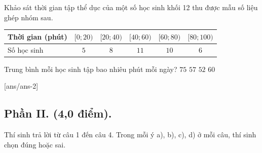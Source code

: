 \begin{ex}
	Khảo sát thời gian tập thể dục của một số học sinh khối 12 thu được mẫu số liệu ghép nhóm sau.
	\begin{center}
		\begin{tabular}{|l|c|c|c|c|c|}
			\hline
			Thời gian (phút) & $[0;20)$ & $[20;40)$ & $[40;60)$ & $[60;80)$ & $[80;100)$ \\
			\hline
			Số học sinh & $5$ & $8$ & $11$ & $10$ & $6$ \\
			\hline
		\end{tabular}
	\end{center}
	Trung bình mỗi học sinh tập bao nhiêu phút mỗi ngày?
	\choice
	{$75$}
	{$57$}
	{\True $52$}
	{$60$}
\end{ex}

[ans/ans-2]
\subsection*{Phần II. (4,0 điểm).} Thí sinh trả lời từ câu 1 đến câu 4. Trong mỗi ý a), b), c), d) ở mỗi câu, thí sinh chọn đúng hoặc sai.
\setcounter{ex}{0}

